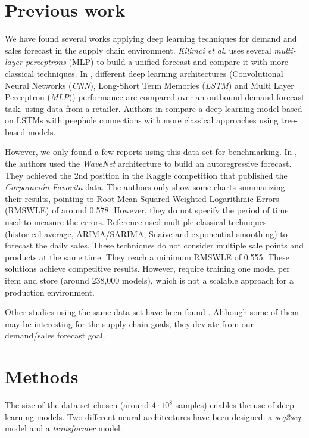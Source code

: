 \documentclass{elsarticle}
\begin{document}
	\section{Previous work}	\label{sec:prevwork}
	We have found several works applying deep learning techniques for demand and sales forecast in the supply chain environment. \textit{Kilimci et al.} \cite{Kilimci2019} uses several \textit{multi-layer perceptrons} (MLP) to build a unified forecast and compare it with more classical techniques. In \cite{Talupula2018}, different deep learning architectures (Convolutional Neural Networks (\textit{CNN}), Long-Short Term Memories (\textit{LSTM}) and Multi Layer Perceptron (\textit{MLP})) performance are compared over an outbound demand forecast task, using data from a retailer. Authors in \cite{Helmini2019} compare a deep learning model based on LSTMs with peephole connections with more classical approaches using tree-based models. 
	
	However, we only found a few reports using this data set for benchmarking. In \cite{kechyn2018}, the authors used the \textit{WaveNet} \cite{vanderoord2016} architecture to build an autoregressive forecast. They achieved the 2nd position in the Kaggle competition that published the \textit{Corporación Favorita} data. The authors only show some charts summarizing their results, pointing to Root Mean Squared Weighted Logarithmic Errors (RMSWLE) of around 0.578. However, they do not specify the period of time used to measure the errors. Reference \cite{Steves2018} used multiple classical techniques (historical average, ARIMA/SARIMA, Snaive and exponential smoothing) to forecast the daily sales. These techniques do not consider multiple sale points and products at the same time. They reach a minimum RMSWLE of 0.555. These solutions achieve competitive results. However, require training one model per item and store (around 238,000 models), which is not a scalable approach for a production environment.

	Other studies using the same data set have been found  \cite{Wang2020, Shaikhha2020, Schleich2019, Lim2019, Curtin2020, Malik2019, Kuleshov2018, Khamis2020}. Although some of them may be interesting for the supply chain goals, they deviate from our demand/sales forecast goal.
	
	\section{Methods} \label{sec:methods}
	The size of the data set chosen (around $4\cdot10^8$ samples) enables the use of deep learning models. Two different neural architectures have been designed: a \textit{seq2seq} model and a \textit{transformer} model.
	
\end{document}
